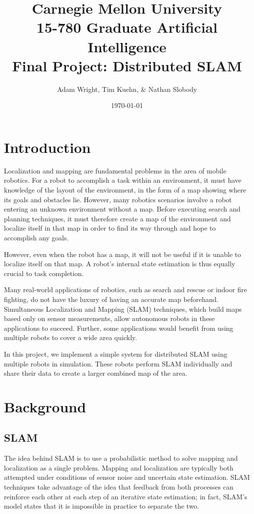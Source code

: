 \documentclass[prodmode,acmtecs]{acmsmall} %
\title{
    Carnegie Mellon University \\
    15-780 Graduate Artificial Intelligence \\
    Final Project: Distributed SLAM
}
\author{
    Adam Wright, Tim Kuehn, \& Nathan Slobody \\
}
\date{\today}
\begin{document}
\maketitle

\setcounter{tocdepth}{2}

\section{Introduction}

Localization and mapping are fundamental problems in the area of mobile robotics.  For a robot to accomplish a task within an environment, it must have knowledge of the layout of the environment, in the form of a map showing where its goals and obstacles lie.  However, many robotics scenarios involve a robot entering an unknown environment without a map.  Before executing search and planning techniques, it must therefore create a map of the environment and localize itself in that map in order to find its way through and hope to accomplish any goals.  

However, even when the robot has a map, it will not be useful if it is unable to localize itself on that map.  A robot's internal state estimation is thus equally crucial to task completion.

Many real-world applications of robotics, such as search and rescue or indoor fire fighting, do not have the luxury of having an accurate map beforehand. Simultaneous Localization and Mapping (SLAM) techniques, which build maps based only on sensor measurements, allow autonomous robots in these applications to succeed. Further, some applications would benefit from using multiple robots to cover a wide area quickly.

In this project, we implement a simple system for distributed SLAM using multiple robots in simulation.  These robots perform SLAM individually and share their data to create a larger combined map of the area.

\section{Background}

\subsection{SLAM}

The idea behind SLAM is to use a probabilistic method to solve mapping and localization as a single problem.  Mapping and localization are typically both attempted under conditions of sensor noise and uncertain state estimation.  SLAM techniques take advantage of the idea that feedback from both processes can reinforce each other at each step of an iterative state estimation; in fact, SLAM's model states that it is impossible in practice to separate the two.
\end{document}
